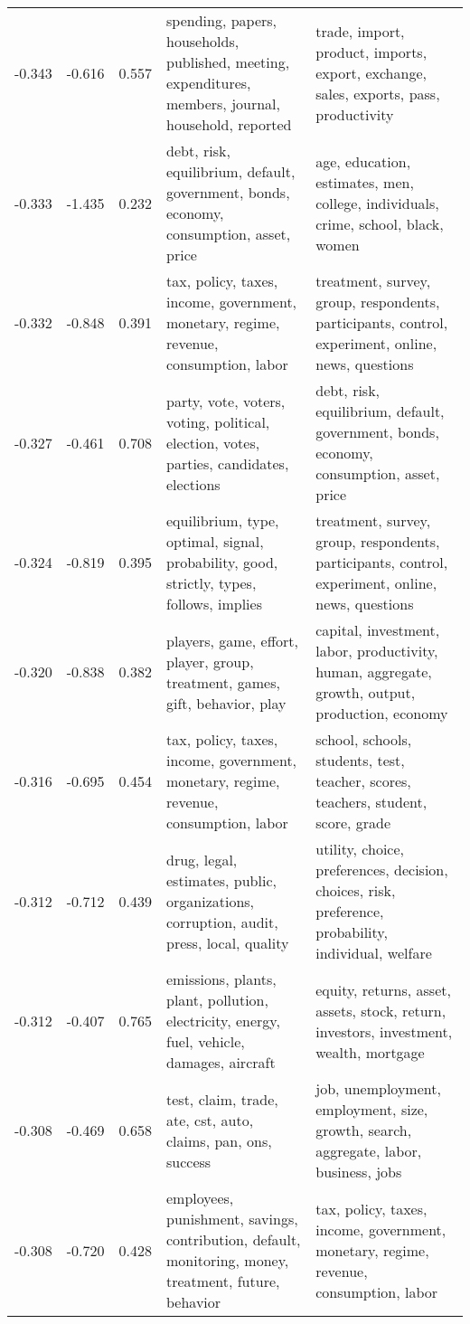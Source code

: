 \begin{tabular}{cccp{5cm}p{5cm}}
-0.343 & -0.616 & 0.557 & spending, papers, households, published, meeting, expenditures, members, journal, household, reported & trade, import, product, imports, export, exchange, sales, exports, pass, productivity \\
-0.333 & -1.435 & 0.232 & debt, risk, equilibrium, default, government, bonds, economy, consumption, asset, price & age, education, estimates, men, college, individuals, crime, school, black, women \\
-0.332 & -0.848 & 0.391 & tax, policy, taxes, income, government, monetary, regime, revenue, consumption, labor & treatment, survey, group, respondents, participants, control, experiment, online, news, questions \\
-0.327 & -0.461 & 0.708 & party, vote, voters, voting, political, election, votes, parties, candidates, elections & debt, risk, equilibrium, default, government, bonds, economy, consumption, asset, price \\
-0.324 & -0.819 & 0.395 & equilibrium, type, optimal, signal, probability, good, strictly, types, follows, implies & treatment, survey, group, respondents, participants, control, experiment, online, news, questions \\
-0.320 & -0.838 & 0.382 & players, game, effort, player, group, treatment, games, gift, behavior, play & capital, investment, labor, productivity, human, aggregate, growth, output, production, economy \\
-0.316 & -0.695 & 0.454 & tax, policy, taxes, income, government, monetary, regime, revenue, consumption, labor & school, schools, students, test, teacher, scores, teachers, student, score, grade \\
-0.312 & -0.712 & 0.439 & drug, legal, estimates, public, organizations, corruption, audit, press, local, quality & utility, choice, preferences, decision, choices, risk, preference, probability, individual, welfare \\
-0.312 & -0.407 & 0.765 & emissions, plants, plant, pollution, electricity, energy, fuel, vehicle, damages, aircraft & equity, returns, asset, assets, stock, return, investors, investment, wealth, mortgage \\
-0.308 & -0.469 & 0.658 & test, claim, trade, ate, cst, auto, claims, pan, ons, success & job, unemployment, employment, size, growth, search, aggregate, labor, business, jobs \\
-0.308 & -0.720 & 0.428 & employees, punishment, savings, contribution, default, monitoring, money, treatment, future, behavior & tax, policy, taxes, income, government, monetary, regime, revenue, consumption, labor \\

\end{tabular}
